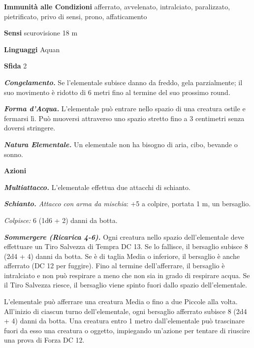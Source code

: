 \begin{multicols}{2}
	\textbf{Immunità alle Condizioni} afferrato, avvelenato, intralciato, paralizzato, pietrificato, privo di sensi, prono, affaticamento

	\textbf{Sensi} scurovisione 18 m

	\textbf{Linguaggi} Aquan

	\textbf{Sfida} 2

	\textit{\textbf{Congelamento.}} Se l'elementale subisce danno da freddo, gela parzialmente; il suo movimento è ridotto di 6 metri fino al termine del suo prossimo round.

	\textit{\textbf{Forma d'Acqua.}} L'elementale può entrare nello spazio di una creatura ostile e fermarsi lì. Può muoversi attraverso uno spazio stretto fino a 3 centimetri senza doversi stringere.

	\textit{\textbf{Natura Elementale.}} Un elementale non ha bisogno di aria, cibo, bevande o sonno.

	\textbf{Azioni}

	\textit{\textbf{Multiattacco.}} L'elementale effettua due attacchi di schianto.

	\textit{\textbf{Schianto.} Attacco con arma da mischia}: +5 a colpire, portata 1 m, un bersaglio.

	\textit{Colpisce:} 6 (1d6 + 2) danni da botta.

	\textit{\textbf{Sommergere (Ricarica 4-6).}} Ogni creatura nello spazio dell'elementale deve effettuare un Tiro Salvezza di Tempra DC 13. Se lo fallisce, il bersaglio subisce 8 (2d4 + 4) danni da botta. Se è di taglia Media o inferiore, il bersaglio è anche afferrato (DC 12 per fuggire). Fino al termine dell'afferrare, il bersaglio è intralciato e non può respirare a meno che non sia in grado di respirare acqua. Se il Tiro Salvezza riesce, il bersaglio viene spinto fuori dallo spazio dell'elementale.

	L'elementale può afferrare una creatura Media o fino a due Piccole alla volta. All'inizio di ciascun turno dell'elementale, ogni bersaglio afferrato subisce 8 (2d4 + 4) danni da botta. Una creatura entro 1 metro dall'elementale può trascinare fuori da esso una creatura o oggetto, impiegando un'azione per tentare di riuscire una prova di Forza DC 12.


\end{multicols}
